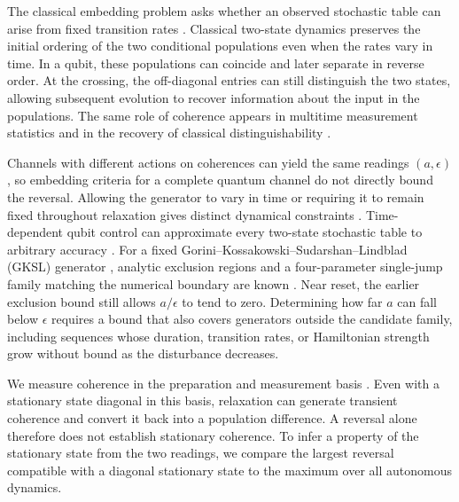 \documentclass[aps,pra,reprint,amsmath,amssymb,nofootinbib,floatfix,longbibliography]{revtex4-2}
\theoremstyle{aps}
\newcommand{\eps}{\epsilon}
\begin{document}
The classical embedding problem asks whether an observed stochastic table can arise from fixed transition rates \cite{Kingman1962,Davies2010}. Classical two-state dynamics preserves the initial ordering of the two conditional populations even when the rates vary in time. In a qubit, these populations can coincide and later separate in reverse order. At the crossing, the off-diagonal entries can still distinguish the two states, allowing subsequent evolution to recover information about the input in the populations. The same role of coherence appears in multitime measurement statistics \cite{Smirne2019} and in the recovery of classical distinguishability \cite{Benatti2024}.

Channels with different actions on coherences can yield the same readings $(a,\eps)$, so embedding criteria for a complete quantum channel \cite{WolfEisert2008} do not directly bound the reversal. Allowing the generator to vary in time or requiring it to remain fixed throughout relaxation gives distinct dynamical constraints \cite{WolfCirac2008,Davalos2019}. Time-dependent qubit control can approximate every two-state stochastic table to arbitrary accuracy \cite{KorzekwaLostaglio2021}. For a fixed Gorini--Kossakowski--Sudarshan--Lindblad (GKSL) generator \cite{GKS1976,Lindblad1976}, analytic exclusion regions and a four-parameter single-jump family matching the numerical boundary are known \cite{Shahbeigi2024}. Near reset, the earlier exclusion bound still allows $a/\eps$ to tend to zero. Determining how far $a$ can fall below $\eps$ requires a bound that also covers generators outside the candidate family, including sequences whose duration, transition rates, or Hamiltonian strength grow without bound as the disturbance decreases.

We measure coherence in the preparation and measurement basis \cite{Streltsov2017}. Even with a stationary state diagonal in this basis, relaxation can generate transient coherence and convert it back into a population difference. A reversal alone therefore does not establish stationary coherence. To infer a property of the stationary state from the two readings, we compare the largest reversal compatible with a diagonal stationary state to the maximum over all autonomous dynamics.
\end{document}
